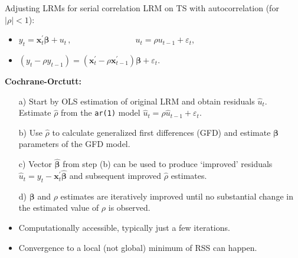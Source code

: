 \documentclass{beamer}
\begin{document}
\begin{frame}{Adjusting LRMs for serial correlation}
LRM on TS with autocorrelation (for $|\rho|<1$):\\ \medskip
\begin{itemize}
    \item $y_t=\bm{x}_t^{\prime} \bm{\beta} + u_t \,,\qquad \qquad \qquad~~~~~~~\, u_t = \rho u_{t-1}+\varepsilon_t$,
    \item $(y_t - \rho y_{t-1}) =  ( \bm{x}_t^{\prime} - \rho \bm{x}_{t-1}^{\prime}) \bm{\beta} + \varepsilon_t$.
\end{itemize}
\medskip
\textbf{Cochrane-Orctutt:} \\ \medskip
\begin{itemize}
    \item[a)] Start by OLS estimation of original LRM and obtain residuals $\hat{u}_t$. Estimate $\hat{\rho}$ from the \texttt{ar(1)} model $\hat{u}_t = \rho \hat{u}_{t-1}+\varepsilon_t$. 
    \item[b)] Use $\hat{\rho}$ to calculate generalized first differences (GFD) and estimate $\bm{\beta}$ parameters of the GFD model.
    \item[c)] Vector $\hat{\bm{\beta}}$ from step (b) can be used to produce `improved' residuals $\hat{u}_t = y_t - \bm{x}_t^{\prime}\hat{\bm{\beta}}$ and subsequent improved $\hat{\rho}$ estimates. 
    \item[d)] $\bm{\beta}$ and $\rho$ estimates are iteratively improved until no substantial change in the estimated value of $\rho$ is observed.
    \medskip
    \item Computationally accessible, typically just a few iterations.
    \item Convergence to a local (not global) minimum of RSS can happen.
\end{itemize}
\end{frame}
\end{document}
